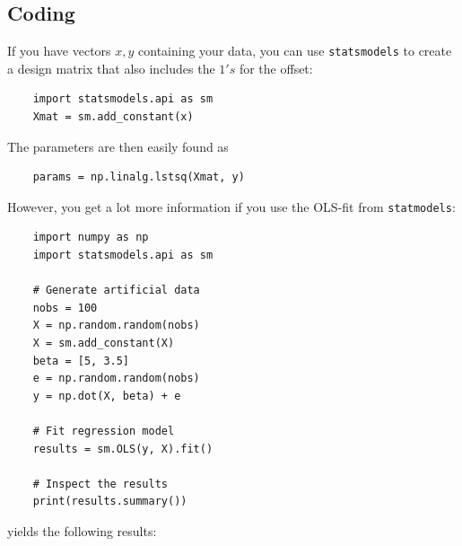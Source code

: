 \subsection{Coding}

If you have vectors $x,y$ containing your data, you can use \lstinline{statsmodels} to create a design matrix that also includes the $1's$ for the offset:

\begin{lstlisting}
    import statsmodels.api as sm
    Xmat = sm.add_constant(x)
\end{lstlisting}

The parameters are then easily found as

\begin{lstlisting}
    params = np.linalg.lstsq(Xmat, y)
\end{lstlisting}

However, you get a lot more information if you use the OLS-fit from \lstinline{statmodels}:

\begin{lstlisting}
    import numpy as np
    import statsmodels.api as sm

    # Generate artificial data
    nobs = 100
    X = np.random.random(nobs)
    X = sm.add_constant(X)
    beta = [5, 3.5]
    e = np.random.random(nobs)
    y = np.dot(X, beta) + e

    # Fit regression model
    results = sm.OLS(y, X).fit()

    # Inspect the results
    print(results.summary())
\end{lstlisting}

yields the following results:

